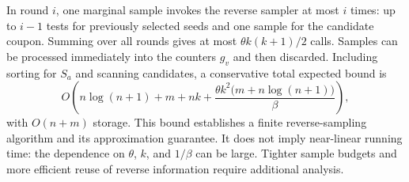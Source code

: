 In round $i$, one marginal sample invokes the reverse sampler at most
$i$ times: up to $i-1$ tests for previously selected seeds and one
sample for the candidate coupon. Summing over all rounds gives at
most $\theta k(k+1)/2$ calls. Samples can be processed immediately
into the counters $g_v$ and then discarded. Including sorting for
$S_a$ and scanning candidates, a conservative total expected bound is
\[
  O\!\left(n\log(n+1)+m+nk+
       \frac{\theta k^2\bigl(m+n\log(n+1)\bigr)}\beta\right),
\]
with $O(n+m)$ storage. This bound establishes a finite reverse-sampling
algorithm and its approximation guarantee. It does not imply
near-linear running time: the dependence on $\theta$, $k$, and
$1/\beta$ can be large. Tighter sample budgets and more efficient
reuse of reverse information require additional analysis.

